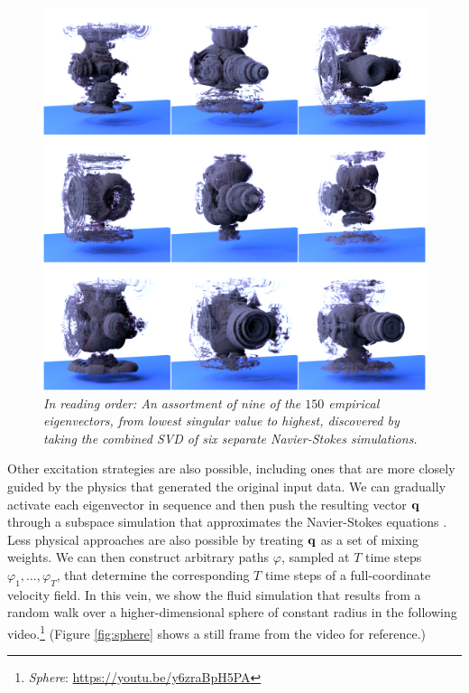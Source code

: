 \begin{figure}
	\centering
	\includegraphics[width=\textwidth]{chap5/figures/modes/montage_recolored.png}
	\caption{\em In reading order: An assortment of nine of the $150$ empirical eigenvectors, from lowest singular value to highest,  discovered by taking the combined SVD of six separate Navier-Stokes simulations.}
	\label{fig:eigs}
\end{figure}

Other excitation strategies are also possible, including ones that are more closely guided by the physics that generated the original input data. We can gradually activate each eigenvector in sequence and then push the resulting vector $\mathbf{q}$ through a subspace simulation that approximates the Navier-Stokes equations \cite{Kim2013}. Less physical approaches are also possible by treating $\mathbf{q}$ as a set of mixing weights. We can then construct arbitrary paths $\varphi$, sampled at $T$ time steps $\varphi_1, \ldots, \varphi_T$, that determine the corresponding $T$ time steps of a full-coordinate velocity field. In this vein, we show the fluid simulation that results from a random walk over a higher-dimensional sphere of constant radius in the following video.\footnote{{\em Sphere}: \url{https://youtu.be/y6zraBpH5PA}} (Figure \ref{fig:sphere} shows a still frame from the video for reference.)

